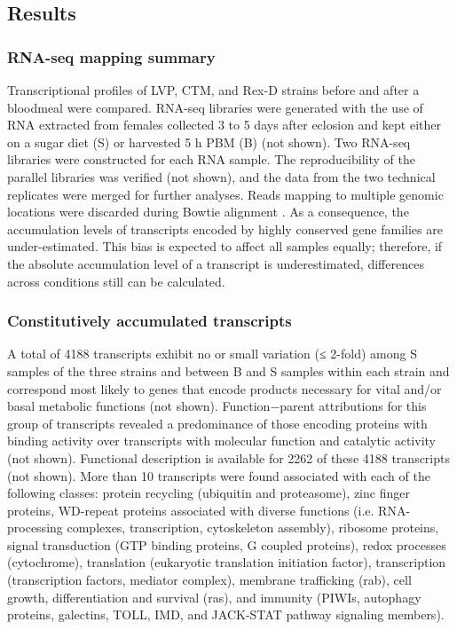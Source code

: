 \subsection{Results}
\subsubsection{RNA-seq mapping summary}

Transcriptional profiles of \gls{LVP}, \gls{CTM}, and \gls{Rex-D} strains before and after a bloodmeal were compared.
RNA-seq libraries were generated with the use of RNA extracted from females collected 3 to 5 days after eclosion and kept either on a sugar diet (S) or harvested 5 h \gls{PBM} (B) (not shown).
Two RNA-seq libraries were constructed for each RNA sample.
The reproducibility of the parallel libraries was verified (not shown), and the data from the two technical replicates were merged for further analyses.
Reads mapping to multiple genomic locations were discarded during Bowtie alignment \cite{Langmead2009}.
As a consequence, the accumulation levels of transcripts encoded by highly conserved gene families are under-estimated.
This bias is expected to affect all samples equally; therefore, if the absolute accumulation level of a transcript is underestimated, differences across conditions still can be calculated.



\subsubsection{Constitutively accumulated transcripts}

A total of 4188 transcripts exhibit no or small variation (≤ 2-fold) among S samples of the three strains and between B and S samples within each strain and correspond most likely to genes that encode products necessary for vital and/or basal metabolic functions (not shown).
Function−parent attributions for this group of transcripts revealed a predominance of those encoding proteins with binding activity over transcripts with molecular function and catalytic activity (not shown).
Functional description is available for 2262 of these 4188 transcripts \cite{Lawson2009} (not shown).
More than 10 transcripts were found associated with each of the following classes: protein recycling (ubiquitin and proteasome), zinc finger proteins, WD-repeat proteins associated with diverse functions (i.e. RNA-processing complexes, transcription, cytoskeleton assembly), ribosome proteins, signal transduction (GTP binding proteins, G coupled proteins), redox processes (cytochrome), translation (eukaryotic translation initiation factor), transcription (transcription factors, mediator complex), membrane trafficking (rab), cell growth, differentiation and survival (ras), and immunity (PIWIs, autophagy proteins, galectins, TOLL, IMD, and JACK-STAT pathway signaling members).


